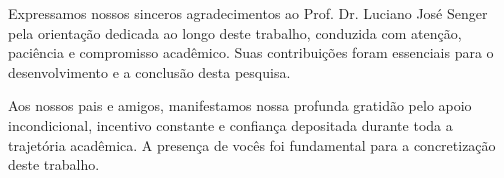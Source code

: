 Expressamos nossos sinceros agradecimentos ao Prof. Dr. Luciano José Senger pela orientação dedicada ao longo deste trabalho, conduzida com atenção, paciência e compromisso acadêmico. Suas contribuições foram essenciais para o desenvolvimento e a conclusão desta pesquisa.

Aos nossos pais e amigos, manifestamos nossa profunda gratidão pelo apoio incondicional, incentivo constante e confiança depositada durante toda a trajetória acadêmica. A presença de vocês foi fundamental para a concretização deste trabalho.